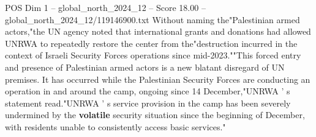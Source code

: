 \begin{textsample}{POS Dim 1 – global\_north\_2024\_12 – Score 18.00 – global\_north\_2024\_12/119146900.txt}
Without naming the"Palestinian armed actors,"the UN agency noted that international grants and donations had allowed UNRWA to repeatedly restore the center from the"destruction incurred in the context of Israeli Security Forces operations since mid-2023.""This forced entry and presence of Palestinian armed actors is a new blatant disregard of UN premises.
It has occurred while the Palestinian Security Forces are conducting an operation in and around the camp, ongoing since 14 December,"UNRWA ' s statement read."UNRWA ' s service provision in the camp has been severely undermined by the \textbf{volatile} security situation since the beginning of December, with residents unable to consistently access basic services."

\end{textsample}
